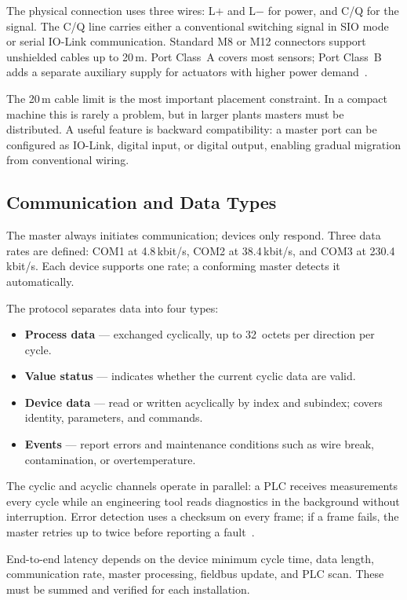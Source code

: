 \documentclass[conference]{IEEEtran}
\begin{document}
The physical connection uses three wires: L$+$ and L$-$ for power, and
C/Q for the signal. The C/Q line carries either a conventional switching
signal in SIO mode or serial IO-Link communication. Standard M8 or M12
connectors support unshielded cables up to 20\,m. Port Class~A covers
most sensors; Port Class~B adds a separate auxiliary supply for
actuators with higher power demand~\cite{iols_sysdesc}.

The 20\,m cable limit is the most important placement constraint. In a
compact machine this is rarely a problem, but in larger plants masters
must be distributed. A useful feature is backward compatibility: a
master port can be configured as IO-Link, digital input, or digital
output, enabling gradual migration from conventional wiring.

\subsection{Communication and Data Types}

The master always initiates communication; devices only respond. Three
data rates are defined: COM1 at 4.8\,kbit/s, COM2 at 38.4\,kbit/s, and
COM3 at 230.4\,kbit/s. Each device supports one rate; a conforming
master detects it automatically.

The protocol separates data into four types:
\begin{itemize}
  \item \textbf{Process data} --- exchanged cyclically, up to
        32~octets per direction per cycle.
  \item \textbf{Value status} --- indicates whether the current cyclic
        data are valid.
  \item \textbf{Device data} --- read or written acyclically by index
        and subindex; covers identity, parameters, and commands.
  \item \textbf{Events} --- report errors and maintenance conditions
        such as wire break, contamination, or overtemperature.
\end{itemize}

The cyclic and acyclic channels operate in parallel: a PLC receives
measurements every cycle while an engineering tool reads diagnostics in
the background without interruption. Error detection uses a checksum on
every frame; if a frame fails, the master retries up to twice before
reporting a fault~\cite{iols_sysdesc}.

End-to-end latency depends on the device minimum cycle time, data
length, communication rate, master processing, fieldbus update, and PLC
scan. These must be summed and verified for each installation.
\end{document}
